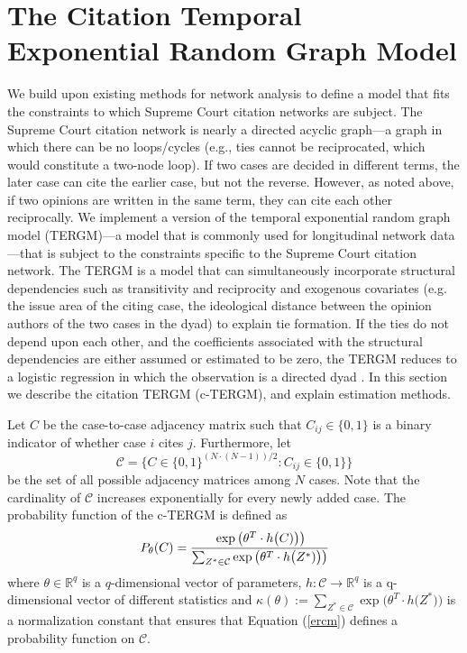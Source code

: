 \documentclass[headsepline=true, abstracton]{scrartcl}
\begin{document}
 \section{The Citation Temporal Exponential Random Graph Model}
We build upon existing methods for network analysis to define a model that fits the constraints to which Supreme Court citation networks are subject. The Supreme Court citation network is nearly a directed acyclic graph---a graph in which there can be no loops/cycles (e.g., ties cannot be reciprocated, which would constitute a two-node loop). If two cases are decided in different terms, the later case can cite the earlier case, but not the reverse. However, as noted above, if two opinions are written in the same term, they can cite each other reciprocally. We implement a version of the temporal exponential random graph model (TERGM)---a model that is commonly used for longitudinal network data \citep[e.g.,][]{cranmer2012complex,desmarais2013forecasting,clark2013multimember,block2018change,graif2017neighborhood}---that is subject to the constraints specific to the Supreme Court citation network. The TERGM is a model that can simultaneously incorporate structural dependencies such as transitivity and reciprocity and exogenous covariates  (e.g. the issue area of the citing case, the ideological distance between the opinion authors of the two cases in the dyad) to explain tie formation. If the ties do not depend upon each other, and the coefficients associated with the structural dependencies are either assumed or estimated to be zero, the TERGM reduces to a logistic regression in which the observation is a directed dyad \citep{cranmer2010inferential}.  In this section we describe the citation TERGM (c-TERGM), and explain estimation methods. 

Let $C$ be the case-to-case adjacency matrix such that $C_{ij} \in \{0,1\}$ is a binary indicator of whether case $i$ cites $j$. Furthermore, let
$$\mathcal{C} =\{C \in \{0,1\}^{(N \cdot (N-1))/2}: C_{ij} \in \{0,1\} \}$$ 
be the set of all possible adjacency matrices among $N$ cases. Note that the cardinality of $\mathcal{C}$ increases exponentially for every newly added case. The probability function of the c-TERGM is defined as
\begin{equation}
P_{\theta}(C)=\cfrac{\exp\big(\theta^T\cdot h\big(C)\big)\big)}{\sum_{Z^*\in \mathcal{C}}\exp\big(\theta^T\cdot h\big(Z^*)\big)\big)}
\label{ercm}
\end{equation}
where $\theta \in \mathbb{R}^q$ is a $q$-dimensional vector of parameters,  $h: \mathcal{C} \to \mathbb{R}^q$ is a q-dimensional vector of different statistics and $\kappa(\theta) := \sum_{Z^*\in \mathcal{C}}\exp\big(\theta^T\cdot h\big(Z^*)\big)$ is a normalization constant that ensures that Equation (\ref{ercm}) defines a probability function on $\mathcal{C}$.
\end{document}

